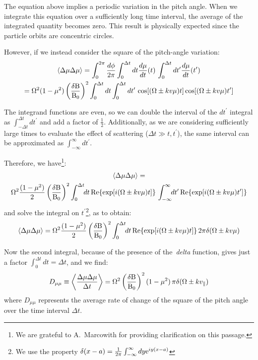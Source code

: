 The equation above implies a periodic variation in the pitch angle. When we integrate this equation over a sufficiently long time interval, the average of the integrated quantity becomes zero. This result is physically expected since the particle orbits are concentric circles.

However, if we instead consider the square of the pitch-angle variation: 
%
\begin{multline}
\langle \Delta \mu \Delta \mu \rangle = \int_0^{2\pi} \frac{d\phi}{2\pi} \int_0^{\Delta t} dt \frac{d\mu}{dt}(t) \, \int_0^{\Delta t} dt^\prime \frac{d\mu}{dt}(t^\prime) \\ = \Omega^2 (1 - \mu^2) \left( \frac{\delta {\rm B}}{{\rm B}_0} \right)^2 \int_{0}^{\Delta t} dt \int_{0}^{\Delta t} dt^\prime \, \cos[(\Omega \pm k v \mu) t] \cos[(\Omega \pm k v \mu) t^\prime]
\end{multline}

The integrand functions are even, so we can double the interval of the $dt^\prime$ integral as $\int_{-\Delta t}^{\Delta t} dt^\prime$ and add a factor of $\frac{1}{2}$. Additionally, as we are considering sufficiently large times to evaluate the effect of scattering ($\Delta t \gg t, t^\prime$), the same interval can be approximated as $\int_{-\infty}^{\infty} dt^\prime$.

Therefore, we have\footnote{We are grateful to A.~Marcowith for providing clarification on this passage.}:
%
\begin{multline}
\langle \Delta \mu \Delta \mu \rangle = \\ \Omega^2 \frac{(1 - \mu^2)}{2} \left( \frac{\delta {\rm B}}{{\rm B}_0} \right)^2 \int_{0}^{\Delta t} \!\! dt \, {\rm Re} \{ \exp[i(\Omega \pm k v \mu) t] \} \, \int_{-\infty}^{\infty} \!\! dt^\prime \,  {\rm Re}\{\exp[i(\Omega \pm k v \mu) t^\prime]\}
\end{multline}
%
and solve the integral on $t^\prime$\footnote{We use the property $\delta(x-a) = \frac{1}{2\pi}\int_{-\infty}^\infty dy {\rm e}^{iy(x-a)}$}, as to obtain:
%
\begin{equation}
\langle \Delta \mu \Delta \mu \rangle = \Omega^2 \frac{(1 - \mu^2)}{2} \left( \frac{\delta {\rm B}}{{\rm B}_0} \right)^2 \int_{0}^{\Delta t} \!\! dt \, {\rm Re} \{ \exp[i(\Omega \pm k v \mu) t] \} \, 2\pi \delta (\Omega \pm k v \mu)
\end{equation}

Now the second integral, because of the presence of the~\emph{delta} function, gives just a factor $\int_{0}^{\Delta t} dt = \Delta t$, and we find:
%
\begin{equation}
D_{\mu\mu} \equiv \left\langle \frac{\Delta \mu \Delta \mu}{\Delta t} \right\rangle = \Omega^2 \left( \frac{\delta {\rm B}}{{\rm B}_0} \right)^2 (1 - \mu^2) \, \pi \delta(\Omega \pm k v_{\parallel})
\label{eq:dmumuvar}
\end{equation}
%
where $D_{\mu \mu}$ represents the average rate of change of the square of the pitch angle over the time interval $\Delta t$.

